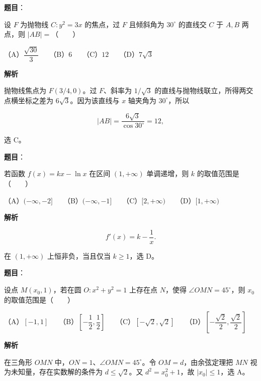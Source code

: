 \begin{answer}

\textbf{题目}：

设 $F$ 为抛物线 $C:y^2=3x$ 的焦点，过 $F$ 且倾斜角为 $30^\circ$ 的直线交 $C$ 于 $A,B$ 两点，则 $|AB|=$\mbox{（　　）}

（A）$\dfrac{\sqrt{30}}3$　　（B）$6$　　（C）$12$　　（D）$7\sqrt3$

\textbf{解析}

抛物线焦点为 $F(3/4,0)$。过 $F$、斜率为 $1/\sqrt3$ 的直线与抛物线联立，所得两交点横坐标之差为 $6\sqrt3$。因为该直线与 $x$ 轴夹角为 $30^\circ$，所以

\nopagebreak[4]
\[
|AB|=\frac{6\sqrt3}{\cos30^\circ}=12,
\]

选 C。


\end{answer}
\begin{answer}

\textbf{题目}：

若函数 $f(x)=kx-\ln x$ 在区间 $(1,+\infty)$ 单调递增，则 $k$ 的取值范围是\mbox{（　　）}

（A）$(-\infty,-2]$　　（B）$(-\infty,-1]$　　（C）$[2,+\infty)$　　（D）$[1,+\infty)$

\textbf{解析}

\nopagebreak[4]
\[
f'(x)=k-\frac1x.
\]

在 $(1,+\infty)$ 上恒非负，当且仅当 $k\geqslant1$，选 D。


\end{answer}
\begin{answer}

\textbf{题目}：

设点 $M(x_0,1)$，若在圆 $O:x^2+y^2=1$ 上存在点 $N$，使得 $\angle OMN=45^\circ$，则 $x_0$ 的取值范围是\mbox{（　　）}

（A）$[-1,1]$　　（B）$\left[-\dfrac12,\dfrac12\right]$　　（C）$[-\sqrt2,\sqrt2]$　　（D）$\left[-\dfrac{\sqrt2}{2},\dfrac{\sqrt2}{2}\right]$

\textbf{解析}

在三角形 $OMN$ 中，$ON=1$、$\angle OMN=45^\circ$。令 $OM=d$，由余弦定理把 $MN$ 视为未知量，存在实数解的条件为 $d\leqslant\sqrt2$。又 $d^2=x_0^2+1$，故 $|x_0|\leqslant1$，选 A。


\end{answer}

